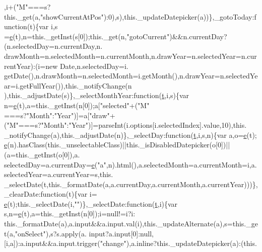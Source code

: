 \begin{DoxyCode}
      ,i+(\textcolor{stringliteral}{"M"}===s?this.\_get(a,\textcolor{stringliteral}{"showCurrentAtPos"}):0),s),this.\_updateDatepicker(a))\},\_gotoToday:\textcolor{keyword}{function}(t)\{var i,s
      =\hyperlink{jquery-ui_8min_8js_a2c038346d47955cbe2cb91e338edd7e1}{e}(t),n=this.\_getInst(s[0]);this.\_get(n,\textcolor{stringliteral}{"gotoCurrent"})&&n.currentDay?(n.selectedDay=n.currentDay,n.
      drawMonth=n.selectedMonth=n.currentMonth,n.drawYear=n.selectedYear=n.currentYear):(i=\textcolor{keyword}{new} Date,n.selectedDay=i.
      getDate(),n.drawMonth=n.selectedMonth=i.getMonth(),n.drawYear=n.selectedYear=i.getFullYear()),this.\_notifyChange(n
      ),this.\_adjustDate(s)\},\_selectMonthYear:\textcolor{keyword}{function}(\hyperlink{jquery-2_80_83_8min_8js_aaccc9105df5383111407fd5b41255e23}{t},i,s)\{var n=\hyperlink{jquery-ui_8min_8js_a2c038346d47955cbe2cb91e338edd7e1}{e}(t),a=this.\_getInst(n[0]);a[\textcolor{stringliteral}{"selected"}+(\textcolor{stringliteral}{"M"}
      ===s?\textcolor{stringliteral}{"Month"}:\textcolor{stringliteral}{"Year"})]=a[\textcolor{stringliteral}{"draw"}+(\textcolor{stringliteral}{"M"}===s?\textcolor{stringliteral}{"Month"}:\textcolor{stringliteral}{"Year"})]=parseInt(i.options[i.selectedIndex].value,10),this.
      \_notifyChange(a),this.\_adjustDate(n)\},\_selectDay:\textcolor{keyword}{function}(\hyperlink{jquery-2_80_83_8min_8js_aaccc9105df5383111407fd5b41255e23}{t},i,s,n)\{var a,o=\hyperlink{jquery-ui_8min_8js_a2c038346d47955cbe2cb91e338edd7e1}{e}(t);
      \hyperlink{jquery-ui_8min_8js_a2c038346d47955cbe2cb91e338edd7e1}{e}(n).hasClass(this.\_unselectableClass)||this.\_isDisabledDatepicker(o[0])||(a=this.\_getInst(o[0]),a.
      selectedDay=a.currentDay=\hyperlink{jquery-ui_8min_8js_a2c038346d47955cbe2cb91e338edd7e1}{e}(\textcolor{stringliteral}{"a"},n).html(),a.selectedMonth=a.currentMonth=i,a.selectedYear=a.currentYear=s,this.
      \_selectDate(t,this.\_formatDate(a,a.currentDay,a.currentMonth,a.currentYear)))\},\_clearDate:\textcolor{keyword}{function}(t)\{var i=
      \hyperlink{jquery-ui_8min_8js_a2c038346d47955cbe2cb91e338edd7e1}{e}(t);this.\_selectDate(i,\textcolor{stringliteral}{""})\},\_selectDate:\textcolor{keyword}{function}(\hyperlink{jquery-2_80_83_8min_8js_aaccc9105df5383111407fd5b41255e23}{t},i)\{var s,n=\hyperlink{jquery-ui_8min_8js_a2c038346d47955cbe2cb91e338edd7e1}{e}(t),a=this.\_getInst(n[0]);i=null!=i?i:
      this.\_formatDate(a),a.input&&a.input.val(i),this.\_updateAlternate(a),s=this.\_get(a,\textcolor{stringliteral}{"onSelect"}),s?s.apply(a.
      input?a.input[0]:null,[i,a]):a.input&&a.input.trigger(\textcolor{stringliteral}{"change"}),a.inline?this.\_updateDatepicker(a):(this.

\end{DoxyCode}
